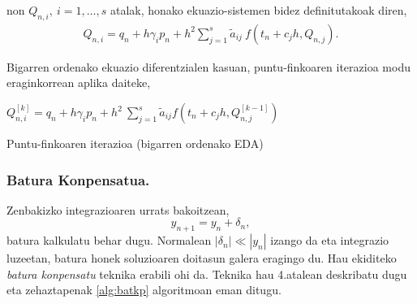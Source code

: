 non $Q_{n,i}, \ i=1,\dots,s$ atalak, honako ekuazio-sistemen bidez definitutakoak diren, 
\begin{align}
Q_{n,i}=q_n+ h\gamma_i p_n+ h^2 \sum\limits_{j=1}^{s} \tilde{a}_{ij} \ f(t_n+c_jh,Q_{n,j}).
\end{align}

Bigarren ordenako ekuazio diferentzialen kasuan, puntu-finkoaren iterazioa modu eraginkorrean aplika daiteke,

\begin{algorithm}[H]
  {
   $Q_{n,i}^{[k]}=q_{n}+h \gamma_i p_{n}+ h^2 \ \sum\limits_{j=1}^{s} \tilde{a}_{ij} f(t_n+c_jh,Q_{n,j}^{[k-1]}) $\;  
  }
 \caption{Puntu-finkoaren iterazioa (bigarren ordenako EDA)}
\end{algorithm} 

%


\subsubsection*{Batura Konpensatua.}

Zenbakizko integrazioaren urrats bakoitzean,
\begin{equation*}
y_{n+1}=y_{n}+ \delta_n,
\end{equation*}
batura kalkulatu behar dugu. Normalean $|\delta_n| \ll |y_n| $ izango da eta integrazio luzeetan, batura honek soluzioaren doitasun galera eragingo du. Hau ekiditeko \emph{batura konpensatu}  teknika \cite{Muller2009,Higham2002,Hairer2006} erabili ohi da. Teknika hau 4.atalean deskribatu dugu eta zehaztapenak \ref{alg:batkp} algoritmoan eman ditugu.
 

